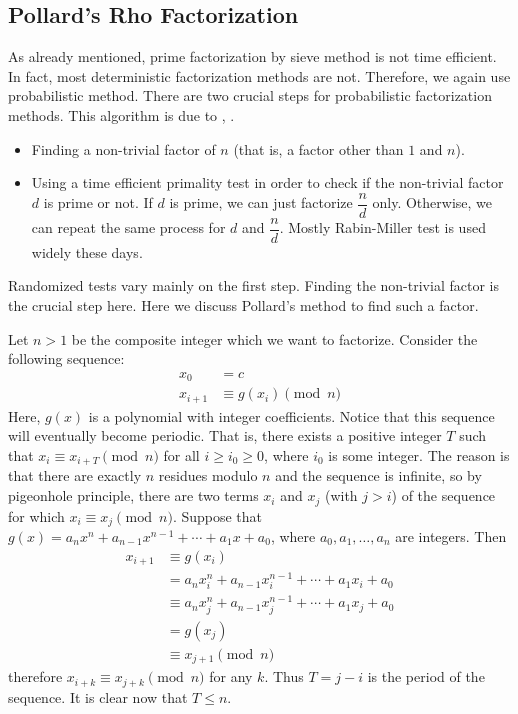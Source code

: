 \subsection{Pollard's Rho Factorization}
As already mentioned, prime factorization by sieve method is not time efficient. In fact, most deterministic factorization methods are not. Therefore, we again use probabilistic method. There are two crucial steps for probabilistic factorization methods. This algorithm is due to \textcite{pollard_1975}, \textcite{brent_1980}.
	\begin{itemize}
		\item Finding a non-trivial factor of $n$ (that is, a factor other than $1$ and $n$).
		\item Using a time efficient primality test in order to check if the non-trivial factor $d$ is prime or not. If $d$ is prime, we can just factorize $\dfrac{n}{d}$ only. Otherwise, we can repeat the same process for $d$ and $\dfrac{n}{d}$. Mostly Rabin-Miller test is used widely these days.
	\end{itemize}
Randomized tests vary mainly on the first step. Finding the non-trivial factor is the crucial step here. Here we discuss Pollard's method to find such a factor.

Let $n>1$ be the composite integer which we want to factorize. Consider the following sequence:
	\begin{align*}
		x_0 &= c\\
		x_{i+1} &\equiv g(x_i) \pmod n
	\end{align*}
Here, $g(x)$ is a polynomial with integer coefficients. Notice that this sequence will eventually become periodic. That is, there exists a positive integer $T$ such that $x_i \equiv x_{i+T} \pmod n$ for all $i\geq i_0\geq 0$, where $i_0$ is some integer. The reason is that there are exactly $n$ residues modulo $n$ and the sequence is infinite, so by pigeonhole principle, there are two terms $x_i$ and $x_j$ (with $j>i$) of the sequence for which $x_i \equiv x_j \pmod n$. Suppose that $g(x)=a_nx^n+a_{n-1}x^{n-1} + \cdots + a_1x+a_0$, where $a_0, a_1, \ldots, a_n$ are integers. Then
	\begin{align*}
		x_{i+1} &\equiv g(x_i) \\
				&= a_nx_i^n+a_{n-1}x_i^{n-1} + \cdots + a_1x_i+a_0 \\
	    &\equiv a_nx_j^n+a_{n-1}x_j^{n-1} + \cdots + a_1x_j+a_0\\
				&= g(x_j) \\
				&\equiv x_{j+1} \pmod n
	\end{align*}
therefore $x_{i+k} \equiv x_{j+k} \pmod n $ for any $k$. Thus $T=j-i$ is the period of the sequence. It is clear now that $T \leq n$.

